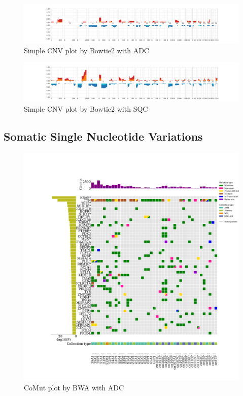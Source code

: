 \documentclass[a4paper]{article}
\begin{document}
            \begin{figure}[htbp]
                \centering
                \includegraphics[width=\linewidth]{figures/Sequenza/Bowtie2-simple-ADC.pdf}
                \caption{Simple CNV plot by Bowtie2 with ADC}
                \label{fig:SimpleCNV-Bowtie2-ADC}
            \end{figure}

            \begin{figure}[htbp]
                \centering
                \includegraphics[width=\linewidth]{figures/Sequenza/Bowtie2-simple-SQC.pdf}
                \caption{Simple CNV plot by Bowtie2 with SQC}
                \label{fig:SimpleCNV-Bowtie2-SQC}
            \end{figure}

        \subsection{Somatic Single Nucleotide Variations}

            \begin{figure}[htbp]
                \centering
                \includegraphics[width=\linewidth]{figures/Mutect2/BWA-ADC.pdf}
                \caption{CoMut plot by BWA with ADC}
                \label{fig:comut-BWA-ADC}
            \end{figure}
\end{document}
